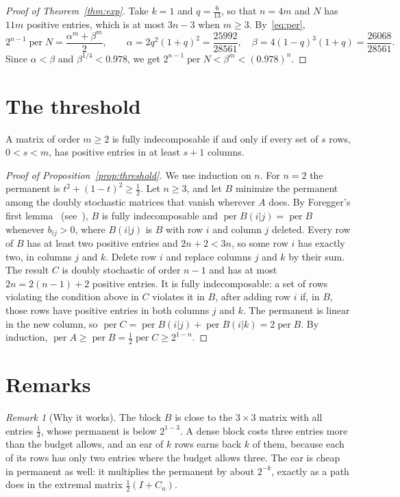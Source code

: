 \documentclass[11pt]{amsart}
\theoremstyle{remark}
\newtheorem{remark}[theorem]{Remark}
\DeclareMathOperator{\per}{per}
\newcommand{\half}{\tfrac12}
\begin{document}
\begin{proof}[Proof of Theorem~\ref{thm:exp}]
Take $k=1$ and $q=\frac{6}{13}$, so that $n=4m$ and $N$ has $11m$ positive
entries, which is at most $3n-3$ when $m\ge3$. By~\eqref{eq:per},
\[
  2^{n-1}\per N=\frac{\alpha^m+\beta^m}{2},\qquad
  \alpha=2q^2(1+q)^2=\frac{25992}{28561},\quad
  \beta=4(1-q)^3(1+q)=\frac{26068}{28561}.
\]
Since $\alpha<\beta$ and $\beta^{1/4}<0.978$, we get
$2^{n-1}\per N<\beta^{m}<(0.978)^{n}$.
\end{proof}

\section{The threshold}

A matrix of order $m\ge2$ is fully indecomposable if and only if every set of
$s$ rows, $0<s<m$, has positive entries in at least $s+1$ columns.

\begin{proof}[Proof of Proposition~\ref{prop:threshold}]
We use induction on $n$. For $n=2$ the permanent is $t^2+(1-t)^2\ge\half$. Let
$n\ge3$, and let $B$ minimize the permanent among the doubly stochastic matrices
that vanish wherever $A$ does. By Foregger's first
lemma~\cite[Lemma~1]{Foregger} (see~\cite[Lemma~2.1]{Lavi}), $B$ is fully
indecomposable and $\per B(i|j)=\per B$ whenever $b_{ij}>0$, where $B(i|j)$ is
$B$ with row $i$ and column $j$ deleted. Every row of $B$ has at least two
positive entries and $2n+2<3n$, so some row $i$ has exactly two, in columns $j$
and $k$. Delete row $i$ and replace columns $j$ and $k$ by their sum. The result
$C$ is doubly stochastic of order $n-1$ and has at most $2n=2(n-1)+2$ positive
entries. It is fully indecomposable: a set of rows violating the condition above
in $C$ violates it in $B$, after adding row $i$ if, in $B$, those rows have
positive entries in both columns $j$ and $k$. The permanent is linear in the new column, so
$\per C=\per B(i|j)+\per B(i|k)=2\per B$. By induction,
$\per A\ge\per B=\half\per C\ge2^{1-n}$.
\end{proof}

\section{Remarks}

\begin{remark}[Why it works]
The block $B$ is close to the $3\times3$ matrix with all entries $\frac13$,
whose permanent is below $2^{1-3}$. A dense block costs three entries more
than the budget allows, and an ear of $k$ rows earns back $k$ of them, because
each of its rows has only two entries where the budget allows three. The ear
is cheap in permanent as well: it multiplies the permanent by about $2^{-k}$,
exactly as a path does in the extremal matrix $\half(I+C_n)$.
\end{remark}
\end{document}
